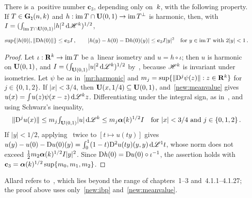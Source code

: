 \begin{lemma}
    \label{al:8.15}
    There is a~positive number $\mathbf{c}_3$, depending only on~$k$, with the following
    property. If $T \in \mathbf{G}_{\natural}(n,k)$ and $h : \operatorname{im} T \cap \mathbf{U}(0,1) \to \operatorname{im} T^\perp$ is
    harmonic, then, with $I = ({\textstyle\int_{\operatorname{im} T \cap \mathbf{U}(0,1)}^{}} |h|^2 \,\mathrm{d} \mathscr{H}^{k})^{1/2}$,
    \begin{gather*}
        \sup \{ |h(0)|, \|\mathrm{D} h(0)\| \} \le \mathbf{c}_3 I \,, \qquad |h(y) - h(0) - \mathrm{D} h(0)(y)| \le
        \mathbf{c}_3 I |y|^2 \quad \text{for $y \in \operatorname{im} T$ with $2 |y| < 1$} \,.
    \end{gather*}
\end{lemma}

\begin{proof}
    Let $\iota : \mathbf{R}^{k} \to \operatorname{im} T$ be a~linear isometry and $u = h \circ \iota$; then $u$ is
    harmonic on $\mathbf{U}(0,1)$, and $I = ({\textstyle\int_{\mathbf{U}(0,1)}^{}} |u|^2 \,\mathrm{d}
    \mathscr{L}^{k})^{1/2}$ by~\cite[2.10.35]{Federer1969}, because $\mathscr{H}^{k}$ is invariant under
    isometries. Let $\psi$ be as in~\ref{mr:harmonic} and $m_j = \sup \{ \|\mathrm{D}^j \psi(z)\| : z \in
    \mathbf{R}^{k} \}$ for $j \in \{0, 1, 2\}$. If $|x| < 3/4$, then $\mathbf{U}(x,1/4) \subseteq
    \mathbf{U}(0,1)$, and~\ref{new:meanvalue} gives $u(x) = {\textstyle\int_{}^{}} u(z) \psi(x - z) \,\mathrm{d}
    \mathscr{L}^{k} z$. Differentiating under the integral sign, as in~\cite[4.1.2]{Federer1969}, and
    using Schwarz's inequality,
    \begin{displaymath}
        \|\mathrm{D}^j u(x)\| \le m_j {\textstyle\int_{\mathbf{U}(0,1)}^{}} |u| \,\mathrm{d} \mathscr{L}^{k} \le m_j
        \boldsymbol{\alpha}(k)^{1/2} I \quad \text{for $|x| < 3/4$ and $j \in \{0, 1, 2\}$} \,.
    \end{displaymath}
    If $|y| < 1/2$, applying~\cite[2.9.20]{Federer1969} twice to $[t \mapsto u(t y)]$ gives $u(y) -
    u(0) - \mathrm{D} u(0)(y) = {\textstyle\int_{0}^{1}} (1 - t) \mathrm{D}^2 u(t y)(y,y) \,\mathrm{d} \mathscr{L}^1 t$, whose norm does not
    exceed $\frac12 m_2 \boldsymbol{\alpha}(k)^{1/2} I |y|^2$. Since $\mathrm{D} h(0) = \mathrm{D} u(0) \circ
    \iota^{-1}$, the assertion holds with $\mathbf{c}_3 = \boldsymbol{\alpha}(k)^{1/2} \sup \{ m_0,
    m_1, m_2 \}$.
\end{proof}

\begin{remark}
    \label{rem:8.15}
    Allard refers to~\cite[5.2.5]{Federer1969}, which lies beyond the range of chapters~1--3
    and~4.1.1--4.1.27; the proof above uses only~\ref{new:ibp} and~\ref{new:meanvalue}.
\end{remark}

